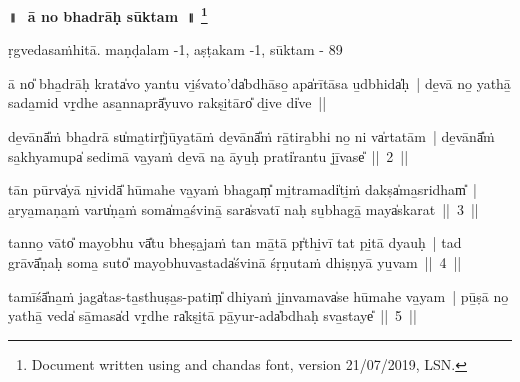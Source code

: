 \documentclass[parskip, DIV=14]{scrartcl}
\renewcommand{\thefootnote}{\fnsymbol{footnote}} %
\begin{document}

\vspace{-1.5cm}

\begin{center}
\textbf{{\Huge॥\,~ā no bhadrāḥ sūktam~॥  \LARGE\let\thefootnote\relax\footnote{\color{lightgray} Document written using \XeLaTeX{} and chandas font,  version 21/07/2019, LSN.}}}

\Large
ṛgvedasaṁhitā. maṇḍalam -1, aṣṭakam -1, sūktam - 89
\end{center}

\vspace{1.0cm}

\Large

ā no̎ bha̱drāḥ krata̍vo yantu vi̱śvato'da̍bdhāso̱ apa̍rītāsa u̱dbhida̍ḥ~| de̱vā no̱ yathā̱ sada̱mid vṛ̱dhe asa̱nnaprā̎yuvo rakṣi̱tāro̎ di̱ve di̍ve~||


de̱vānā̎ṁ bha̱drā su̍ma̱tirṛ̍jūya̱tāṁ de̱vānā̎ṁ rā̱tira̱bhi no̱ ni va̍rtatām~| de̱vānā̎ṁ sa̱khyamupa̍ sedimā va̱yaṁ de̱vā na̱ āyu̱ḥ prati̍rantu jī̱vase̎~||~2~||


tān pūrva̍yā ni̱vidā̎ hūmahe va̱yaṁ bhagaṃ̎ mi̱tramadi̍ti̱ṁ dakṣa̍ma̱sridham̎~| a̱rya̱maṇa̱ṁ varu̍ṇa̱ṁ soma̍ma̱śvinā̱ sara̍svatī naḥ su̱bhagā̱ maya̍skarat~||~3~||


tanno̱ vāto̎ mayo̱bhu vā̎tu bheṣa̱jaṁ tan mā̱tā pṛ̍thi̱vī tat pi̱tā dyauḥ~| tad grāvā̎ṇaḥ soma̱ suto̎ mayo̱bhuva̱stada̍śvinā śṛṇutaṁ dhiṣṇyā yu̱vam~||~4~||


tamīśā̎na̱ṁ jaga̍tas-ta̱sthuṣa̱s-patiṃ̎ dhiyaṁ ji̱nvamava̍se hūmahe va̱yam~| pū̱ṣā no̱ yathā̱ veda̍ sā̱masa̍d vṛ̱dhe ra̍kṣi̱tā pā̱yur-ada̍bdhaḥ sva̱staye̎~||~5~||
\end{document}
